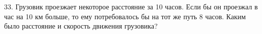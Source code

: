 33. Грузовик проезжает некоторое расстояние за 10 часов. Если бы он проезжал в час на 10 км больше, то ему потребовалось бы на тот же путь 8 часов. Каким было расстояние и скорость движения грузовика?\\
